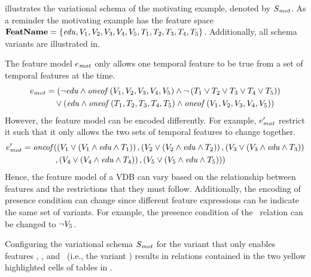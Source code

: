 \begin{example}
\label{eg:vsch-mot}
 illustrates the variational schema of the motivating example, denoted by
$\vSch_\mot$. 
As a reminder the motivating example has the feature space $\fSet = \setDef {\edu,
\vOne, \vTwo, \vThree, \vFour, \vFive, \tOne, \tTwo, \tThree, \tFour, \tFive}$. Additionally,
all schema variants are illustrated in. 


The feature model $\dimMeta_\mot$ only allows one temporal feature to be true from a set of temporal features at the time. 
\begin{align*}
\dimMeta_\mot &= 
\left( 
\neg \edu \wedge \oneof{
\vOne, \vTwo, \vThree, \vFour, \vFive
}
\wedge \neg \left(\tOne \vee \tTwo \vee \tThree \vee \tFour \vee \tFive
 \right)
\right)\\
&\quad\vee 
\left( \edu \wedge \oneof{
\tOne, \tTwo, \tThree, \tFour, \tFive
} \wedge
\oneof{
\vOne, \vTwo, \vThree, \vFour, \vFive
} \right)
\end{align*}
\noindent
However, the feature model can be encoded differently. For example, $\VVal {\dimMeta_\mot}$ restrict 
it such that it only allows 
the two sets of temporal features to change together.
\begin{align*}
\VVal {\dimMeta_\mot} &= 
\mathit{oneof} (
\left( \vOne \vee \left(\vOne \wedge \edu \wedge \tOne \right) \right)
,
\left( \vTwo \vee \left(\vTwo \wedge \edu \wedge \tTwo \right) \right)
,
\left( \vThree \vee \left(\vThree \wedge \edu \wedge \tThree \right) \right)\\
&\qquad\qquad,
\left( \vFour \vee \left(\vFour \wedge \edu \wedge \tFour \right) \right)
,
\left( \vFive \vee \left(\vFive \wedge \edu \wedge \tFive \right) \right)
)
\end{align*}
\noindent
Hence, the feature model of a VDB can vary based on the relationship between 
features and the restrictions that they must follow.
Additionally, the encoding of presence condition can change since different feature 
expressions can be indicate the same set of variants.
For example, the presence condition of the \job\ relation can be changed to \ensuremath{\neg \vFive}. 

%
Configuring the variational schema $\vSch_\mot$ for the variant that only enables features
\edu, \vTwo, and \tThree\ (i.e., the variant \setDef {\edu, \vTwo, \tThree}) results in 
relations contained in the two yellow highlighted cells of tables in .
\end{example}

